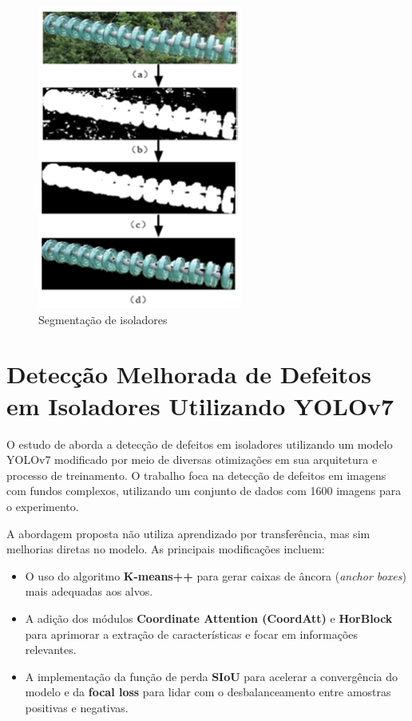 \begin{figure}[H]
    \centering
    \caption{\label{fig:segmentacao_zhang2022}Segmentação de isoladores}
    \includegraphics[width=0.6\textwidth]{img/trabalhos_relacionados/segmentacao_zhang2022.png}
\end{figure}

\section{Detecção Melhorada de Defeitos em Isoladores Utilizando YOLOv7}
O estudo de  aborda a detecção de defeitos em isoladores utilizando um modelo YOLOv7 modificado por meio de diversas otimizações em sua arquitetura e processo de treinamento. O trabalho foca na detecção de defeitos em imagens com fundos complexos, utilizando um conjunto de dados com 1600 imagens para o experimento.

A abordagem proposta não utiliza aprendizado por transferência, mas sim melhorias diretas no modelo. As principais modificações incluem:
\begin{itemize}
    \item O uso do algoritmo \textbf{K-means++} para gerar caixas de âncora (\textit{anchor boxes}) mais adequadas aos alvos.
    \item A adição dos módulos \textbf{Coordinate Attention (CoordAtt)} e \textbf{HorBlock} para aprimorar a extração de características e focar em informações relevantes.
    \item A implementação da função de perda \textbf{SIoU} para acelerar a convergência do modelo e da \textbf{focal loss} para lidar com o desbalanceamento entre amostras positivas e negativas.
\end{itemize}

